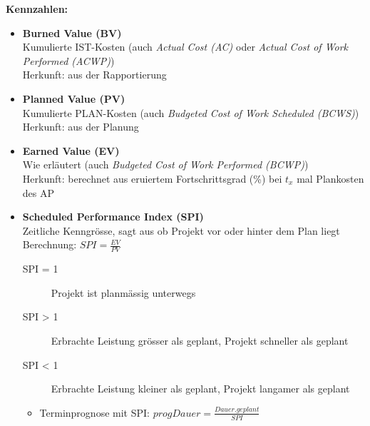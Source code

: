 \documentclass[a4paper]{article}
\begin{document}
		\textbf{Kennzahlen:}
		\begin{itemize}[itemsep=0.5em]
			\item \textbf{Burned Value (BV)}\\
			Kumulierte IST-Kosten (auch \textit{Actual Cost (AC)} oder \textit{Actual Cost of Work Performed (ACWP)})\\
			Herkunft: aus der Rapportierung
			
			\item \textbf{Planned Value (PV)}\\
			Kumulierte PLAN-Kosten (auch \textit{Budgeted Cost of Work Scheduled (BCWS)})\\
			Herkunft: aus der Planung
			
			\item \textbf{Earned Value (EV)}\\
			Wie erläutert (auch \textit{Budgeted Cost of Work Performed (BCWP)})\\
			Herkunft: berechnet aus eruiertem Fortschrittsgrad (\%) bei $t_x$ mal Plankosten des AP
			
			\item \textbf{Scheduled Performance Index (SPI)}\\
			Zeitliche Kenngrösse, sagt aus ob Projekt vor oder hinter dem Plan liegt\\
			Berechnung: $SPI = \frac{EV}{PV}$
				\begin{description}
					\item[SPI = 1] Projekt ist planmässig unterwegs
					\item[SPI > 1] Erbrachte Leistung grösser als geplant, Projekt schneller als geplant
					\item[SPI < 1] Erbrachte Leistung kleiner als geplant, Projekt langamer als geplant\\
				\end{description}
			\begin{itemize}
				\item Terminprognose mit SPI: $progDauer = \frac{Dauer.geplant}{SPI}$\\
			\end{itemize}
			

\end{itemize}
\end{document}
